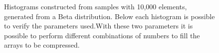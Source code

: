 \documentclass[10pt]{article}
\begin{document}
\begin{figure}[h]
{  }
  \caption{Histograms constructed from samples with 10,000 elements, generated 
from a Beta distribution. Below each histogram is possible to verify the 
parameters used.With these two parameters it is possible to perform different 
combinations of numbers to fill the arrays to be compressed.}
  \label{fig:02030405}
\end{figure}
\end{document}
